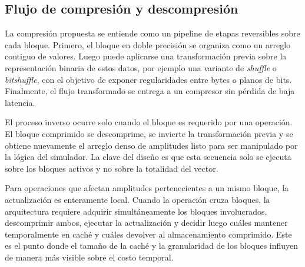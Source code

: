 \subsection{Flujo de compresión y descompresión}

La compresión propuesta se entiende como un pipeline de etapas reversibles sobre cada bloque. Primero, el bloque en doble precisión se organiza como
un arreglo contiguo de valores. Luego puede aplicarse una transformación previa sobre la representación binaria de estos datos, por ejemplo una
variante de \emph{shuffle} o \emph{bitshuffle}, con el objetivo de exponer regularidades entre bytes o planos de bits. Finalmente, el flujo transformado
se entrega a un compresor sin pérdida de baja latencia.

El proceso inverso ocurre solo cuando el bloque es requerido por una operación. El bloque comprimido se descomprime, se invierte la transformación
previa y se obtiene nuevamente el arreglo denso de amplitudes listo para ser manipulado por la lógica del simulador. La clave del diseño es que esta
secuencia solo se ejecuta sobre los bloques activos y no sobre la totalidad del vector.

Para operaciones que afectan amplitudes pertenecientes a un mismo bloque, la actualización es enteramente local. Cuando la operación cruza bloques,
la arquitectura requiere adquirir simultáneamente los bloques involucrados, descomprimir ambos, ejecutar la actualización y decidir luego cuáles
mantener temporalmente en caché y cuáles devolver al almacenamiento comprimido. Este es el punto donde el tamaño de la caché y la granularidad de los
bloques influyen de manera más visible sobre el costo temporal.